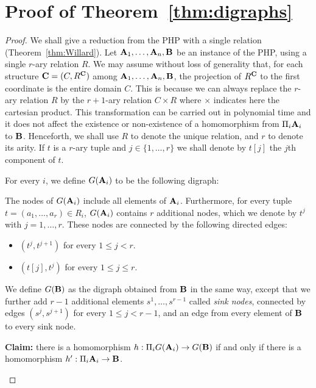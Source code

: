 \documentclass{article}
\newcommand{\aest}{{\bf A}}
\newcommand{\best}{{\bf B}}
\newcommand{\cest}{{\bf C}}
\begin{document}
\section{Proof of Theorem~\ref{thm:digraphs}}

\begin{proof}
  We shall give a reduction from the PHP with a single
  relation (Theorem~\ref{thm:Willard}). Let $\aest_1,\dots,\aest_n,\best$ be
  an instance of the PHP, using a single $r$-ary relation $R$. We may
  assume without loss of generality that, for each structure
  $\cest=(C,R^\cest)$  among  $\aest_1,\dots,\aest_n,\best$, the projection of
  $R^\cest$ to the first coordinate is the entire domain $C$.
  This is because we can always replace the $r$-ary relation $R$ by
  the
  $r+1$-ary relation $C\times R$ where $\times$
  indicates here the cartesian product.
 This
  transformation can be carried out in polynomial time and it does not affect
  the existence or non-existence of a homomorphism from
  $\Pi_i\aest_i$ to $\best$.
Henceforth, we shall use $R$ to denote the unique relation, and $r$ to
denote its arity. 
If $t$ is a $r$-ary tuple and $j\in\{1,\dots,r\}$ we shall denote by $t[j]$ the $j$th component of $t$.

For every $i$, we define $G(\aest_i)$ to be the following digraph:


The nodes of $G(\aest_i)$ include all elements of $\aest_i$. Furthermore,
for every tuple $t=(a_1,\dots,a_r)\in R_i$, $G(\aest_i)$ contains $r$
additional nodes, which we
denote by $t^j$ with $j=1,\dots,r$.
 These nodes are connected by
the following directed edges:
\begin{itemize}

\item $(t^j,t^{j+1})$ for every $1\leq j<r$.

\item $(t[j],t^j)$ for every $1\leq j\leq r$.

\end{itemize}



We define $G(\best)$ as  the digraph obtained from $\best$ in the
same way, except that we further add 
$r-1$ additional elements $s^1,\dots,s^{r-1}$ called {\em sink nodes},
connected by edges $(s^j,s^{j+1})$ for every $1\leq j< r-1$, and 
an edge from every element of $\best$ to every sink node.

\begin{trivlist}
\item \textbf{Claim:} there is a homomorphism $h:\Pi_i G(\aest_i)\to G(\best)$ if and only if
  there is a homomorphism $h':\Pi_i\aest_i\to\best$.
\end{trivlist}


\end{proof}
\end{document}
